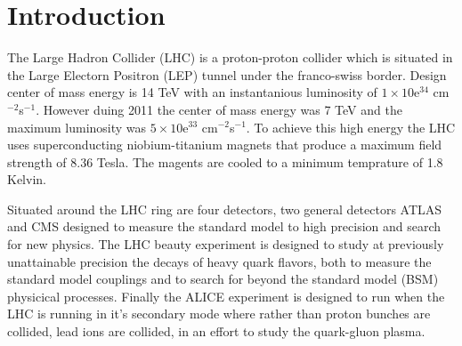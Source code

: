\chapter{Introduction} %
\label{cha:introduction}
The Large Hadron Collider (LHC) \cite{Benedikt:823808} is a proton-proton collider which is situated in the Large Electorn Positron (LEP) tunnel under the
franco-swiss border. Design center of mass energy is 14 TeV with an instantanious luminosity of $ 1 \times 10$e$^{34}$
cm$^{-2}$s$^{-1}$. However duing 2011 the center of mass energy was 7 TeV and the maximum luminosity was $ 5 \times 10$e$^{33}$
cm$^{-2}$s$^{-1}$.
To achieve this high energy the LHC uses superconducting niobium-titanium magnets that produce a maximum field strength of 8.36
Tesla. The magents are cooled to a minimum temprature of 1.8 Kelvin.

Situated around the LHC ring are four detectors, two general detectors ATLAS \cite{Akesson:1999uv} and CMS
\cite{Friedl:1140134}\cite{Wulz:vf} designed to measure the standard model to high precision and search for new physics. The LHC beauty
experiment \cite{Rademacker:2005tx} is designed to study at previously unattainable precision the decays of heavy quark flavors, both to
measure the standard model couplings and to search for beyond the standard model (BSM) physicical processes. Finally the ALICE \cite{Alessandro:2006ht}
experiment is designed to run when the LHC is running in it's secondary mode where rather than proton bunches are collided, lead
ions are collided, in an effort to study the quark-gluon plasma.
